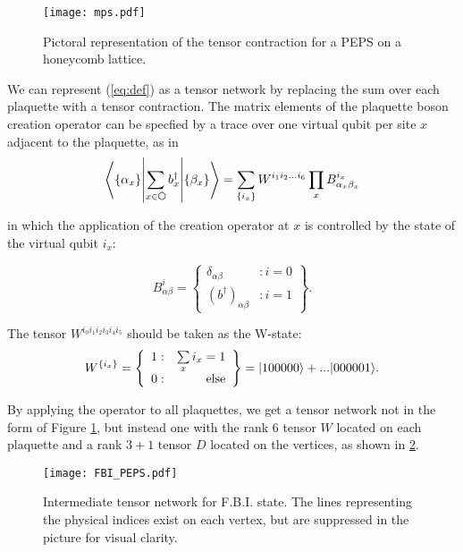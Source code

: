 \begin{figure}[H]
	\centering
	\texttt{[image: mps.pdf]}
	\caption{Pictoral representation of the tensor contraction for a PEPS on a honeycomb lattice.}
	\label{fig:PEPS}
\end{figure}

We can represent (\ref{eq:def}) as a tensor network by replacing the sum over each plaquette with a tensor contraction. The matrix elements of the plaquette boson creation operator can be specfied by a trace over one virtual qubit per site $x$ adjacent to the plaquette, as in 
\begin{equation}
\braopket{\{\alpha_x\}}{\sum\limits_{x \in \varhexagon} b^{\dagger}_{x}}{\{\beta_x\}} =
 \sum\limits_{\{i_x\}} W^{i_1 i_2 ... i_6} \prod\limits_x B^{i_x}_{\alpha_x \beta_x} 
\label{eq:plaquette}
\end{equation}

in which the application of the creation operator at $x$ is controlled by the state of the virtual qubit $i_x$:

$$
B^i_{\alpha \beta} = \left\{
     \begin{array}{lr}
       \delta_{\alpha \beta} & : i = 0\\
       (b^{\dagger})_{\alpha \beta} & : i = 1
     \end{array}
   \right\}.
$$

The tensor $W^{i_0 i_1 i_2 i_3 i_4 i_5}$ should be taken as the W-state: 
$$ W^{\{i_x\}}  = \left\{ \begin{array}{lr}
													1  : & \sum\limits_x i_x = 1 \\
													0  : & \text{else}
													\end{array}
											\right\} = \vert 100000 \rangle + ...\vert 000001 \rangle.
$$

By applying the operator to all plaquettes, we get a tensor network not in the form of Figure \ref{fig:PEPS}, but instead one with the rank 6 tensor $W$ located on each plaquette and a rank $3+1$ tensor $D$ located on the vertices, as shown in \ref{fig:FBI_PEPS}. 

\begin{figure}[H]
	\centering
	\texttt{[image: FBI\_PEPS.pdf]}
	\caption{Intermediate tensor network for F.B.I. state. The lines representing the physical indices exist on each vertex, but are suppressed in the picture for visual clarity.}
	\label{fig:FBI_PEPS}
\end{figure}


